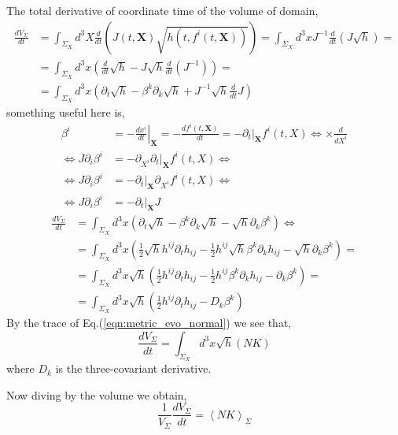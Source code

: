 The total derivative of coordinate time of the volume of domain,
\begin{align}
	\frac{d V_\Sigma}{dt} &= \int_{\Sigma_X}d^3X  \frac{d}{dt}\left(J(t,\mathbf{X})\sqrt{h(t,f^i(t,\mathbf{X}))}\right)=\int_{\Sigma_X}d^3x J^{-1} \frac{d}{dt}\left(J \sqrt{h}\right)=\\
	&=\int_{\Sigma_X}d^3x \left(\frac{d}{dt}\sqrt{h} - J \sqrt{h} \frac{d}{dt}\left(J^{-1}\right)\right)=\\
	&=\int_{\Sigma_X}d^3x \left(\partial_t\sqrt{h}-\beta^k\partial_k \sqrt{h} + J^{-1} \sqrt{h} \frac{d}{dt}J\right)
\end{align}
something useful here is,
\begin{align}
	\beta^i&=-\left.\frac{dx^i}{dt}\right|_{\mathbf{X}}=-\frac{d f^i(t,\mathbf{X})}{dt}=-\partial_t|_{\mathbf{X}} f^i(t,X) \Leftrightarrow \times \frac{d}{dX^i}\\
	\Leftrightarrow J \partial_i \beta^i &=- \partial_{X^i} \partial_t|_{\mathbf{X}} f^i(t,X) \Leftrightarrow \\
	\Leftrightarrow J \partial_i \beta^i &=- \partial_t|_{\mathbf{X}}  \partial_{X^i} f^i(t,X)\Leftrightarrow \\
	\Leftrightarrow J \partial_i \beta^i &=- \partial_t|_{\mathbf{X}}  J
\end{align}
\begin{align}
	\frac{d V_\Sigma}{dt} &=\int_{\Sigma_X}d^3x \left(\partial_t\sqrt{h}-\beta^k\partial_k \sqrt{h} - \sqrt{h} \partial_k \beta^k\right)\Leftrightarrow\\
	&=\int_{\Sigma_X}d^3x \left(\frac{1}{2}\sqrt{h} h^{ij}\partial_t h_{ij}-\frac{1}{2} h^{ij}\sqrt{h}\beta^k\partial_k h_{ij} - \sqrt{h} \partial_k \beta^k\right)=\\
	&=\int_{\Sigma_X}d^3x \sqrt{h} \left(\frac{1}{2} h^{ij}\partial_t h_{ij}-\frac{1}{2} h^{ij}\beta^k\partial_k h_{ij} - \partial_k \beta^k\right)=\\
	&=\int_{\Sigma_X}d^3x \sqrt{h} \left(\frac{1}{2} h^{ij}\partial_t h_{ij}-D_k\beta^k\right)
\end{align}
By the trace of Eq.(\ref{eqn:metric_evo_normal}) we see that,
\begin{equation}
	\frac{d V_\Sigma}{dt} =\int_{\Sigma_X}d^3x \sqrt{h}\left(NK\right)
\end{equation}
where $D_k$ is the three-covariant derivative.

Now diving by the volume we obtain,
\begin{equation}
	\frac{1}{V_\Sigma}\frac{d V_\Sigma}{dt} = \left\langle NK \right\rangle_{\Sigma}
	\label{eqn:general_volume_buchert}
\end{equation}

